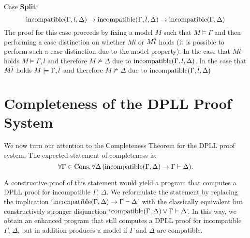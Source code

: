 \begin{mytheorem}[Soundness]
Case \textbf{Split}:
$$\mathrm{incompatible}(\Gamma, l,\Delta) \to \mathrm{incompatible}(\Gamma, \overline{l},\Delta) \to \mathrm{incompatible}(\Gamma,\Delta)$$
The proof for this case proceeds by fixing a model $M$ such that $M \models \Gamma$ and then performing a case distinction on whether $M l$ or $M \overline{l}$ holds (it is possible to perform such a case distinction due to the model property). In the case that $M l$ holds $M \models \Gamma, l$ and therefore $M \not\models \Delta$ due to $\mathrm{incompatible}(\Gamma,l,\Delta)$. In the case that $M \overline{l}$ holds $M \models \Gamma, \overline{l}$ and therefore $M \not\models \Delta$ due to $\mathrm{incompatible}(\Gamma, \overline{l},\Delta)$

\end{mytheorem}


\section{Completeness of the DPLL Proof System}

We now turn our attention to the Completeness Theorem for the DPLL proof 
system. The expected statement of completeness is:
$$ \forall \Gamma\in\mathrm{Cons}, \forall \Delta\, 
      (\mathrm{incompatible}(\Gamma,\Delta) \to \Gamma \vdash \Delta). $$

A constructive proof of this statement would yield a program that
computes a DPLL proof for incompatible $\Gamma$, $\Delta$.
We reformulate the statement by replacing the implication
`$\mathrm{incompatible}(\Gamma,\Delta) \to \Gamma \vdash\Delta$' with
the classically equivalent but constructively
stronger disjunction  
`$\mathrm{compatible}(\Gamma,\Delta) \vee \Gamma \vdash \Delta$'.
%
In this way, we obtain an enhanced program that still computes a DPLL
proof for incompatible $\Gamma$, $\Delta$, but in addition produces a model
if $\Gamma$ and $\Delta$ are compatible.

